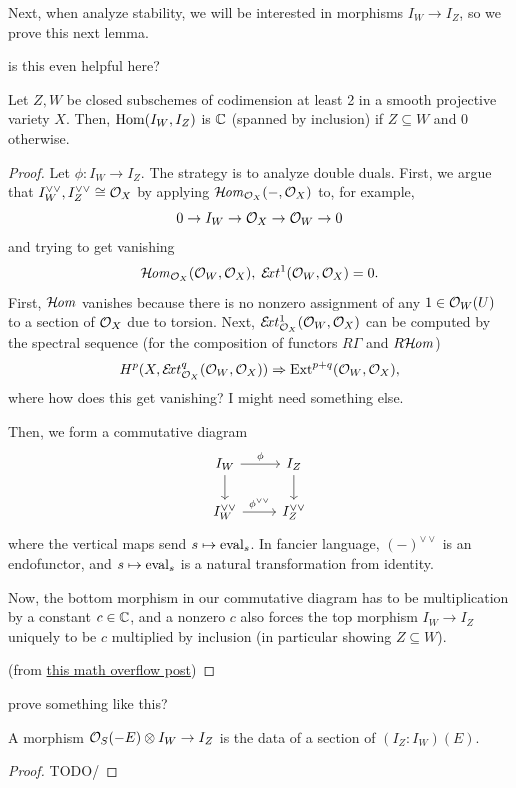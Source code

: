 \documentclass[12pt]{article}
\newcommand{\cExt}{\mathcal{E}\hspace{-0.2em}xt}
\begin{document}
Next, when analyze stability, we will be interested in morphisms $I_W\to I_Z$, so we prove this next lemma.


{\color{red} is this even helpful here?}
\begin{lem}
    Let $Z,W$ be closed subschemes of codimension at least 2 in a smooth projective variety $X$. Then, $\mathrm{Hom}(I_W,I_Z)$ is $\mathbb{C}$ (spanned by inclusion) if $Z\subseteq W$ and 0 otherwise.
\end{lem}
\begin{proof}
    Let $\phi: I_W\to I_Z$. The strategy is to analyze double duals. First, we argue that $I_W^{\vee\vee},I_Z^{\vee\vee} \cong \mathcal{O}_X$ by applying $\mathcal{H}\kern -1pt \mathit{om}_{\mathcal{O}_X}(-,\mathcal{O}_X)$ to, for example,
    \[0\to I_W \to \mathcal{O}_X \to \mathcal{O}_W \to 0\]
    and trying to get vanishing
    \[\cHom_{\cO_X}(\cO_W,\cO_X),\; \cExt^1(\cO_W,\cO_X)=0.\]
    First, $\mathcal{H}\kern -1pt \mathit{om}$ vanishes because there is no nonzero assignment of any $1\in \mathcal{O}_W(U)$ to a section of $\mathcal{O}_X$ due to torsion. Next, $\cExt_{\cO_X}^1(\cO_W,\cO_X)$ can be computed by the spectral sequence (for the composition of functors $R\Gamma$ and $R\mathcal{H}\kern -1pt \mathit{om}$)
    \[H^p(X,\cExt_{\cO_X}^q(\cO_W,\cO_X)) \Rightarrow \Ext^{p+q}(\cO_W,\cO_X),\]
    where {\color{red} how does this get vanishing? I might need something else}.

    Then, we form a commutative diagram
    \[\begin{tikzcd}
        I_W \rar["\phi"] \dar & I_Z \dar\\
        I_W^{\vee\vee} \rar["\phi^{\vee\vee}"] & I_Z^{\vee\vee}
    \end{tikzcd}\]
    where the vertical maps send $s\mapsto \mathrm{eval}_s$. In fancier language, $(-)^{\vee\vee}$ is an endofunctor, and $s\mapsto \mathrm{eval}_s$ is a natural transformation from identity.
    
    Now, the bottom morphism in our commutative diagram has to be multiplication by a constant $c\in \mathbb{C}$, and a nonzero $c$ also forces the top morphism $I_W\to I_Z$ uniquely to be $c$ multiplied by inclusion (in particular showing $Z\subseteq W$).

    (from \href{https://mathoverflow.net/questions/458245/homomorphism-between-ideal-sheaves-of-codimension-2}{this math overflow post})
\end{proof}


{\color{red} prove something like this?}
\begin{lem}\label{rank-1-destabilizer-morphism}
    A morphism $\mathcal{O}_S(-E)\otimes I_W \to I_Z$ is the data of a section of $(I_Z: I_W)(E)$.
\end{lem}
\begin{proof}
    {\color{red} TODO}/
\end{proof}
\end{document}
